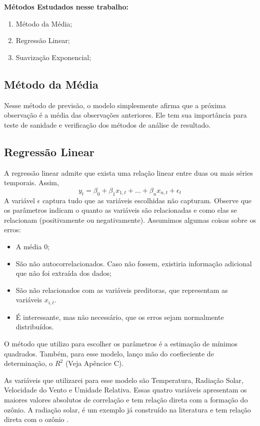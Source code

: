 \textbf{Métodos Estudados nesse trabalho: }
\begin{enumerate}
    \item Método da Média;
    \item Regressão Linear;
    \item Suavização Exponencial; 
\end{enumerate}

\subsection{Método da Média}

Nesse método de previsão, o modelo simplesmente afirma que a próxima
observação é a média das observações anteriores. Ele tem sua importância para
teste de sanidade e verificação dos métodos de análise de resultado.

\subsection{Regressão Linear}

A regressão linear admite que exista uma relação linear entre duas ou mais
séries temporais. Assim, 
$$y_t = \beta_0 + \beta_1x_{1,t} + ... + \beta_nx_{n,t}+ \epsilon_t$$
A variável $\epsilon$ captura tudo que as variáveis escolhidas não capturam.
Observe que os parâmetros indicam o quanto as variáveis são relacionadas e
como elas se relacionam (positivamente ou negativamente). Assumimos algumas
coisas sobre os erros: 

\begin{itemize}
    \item A média $0$;
    \item São não autocorrelacionados. Caso não fossem, existiria informação
    adicional que não foi extraída dos dados;
    \item São não relacionados com as variáveis preditoras, que representam as
    variáveis $x_{i,t}$. 
    \item É interessante, mas não necessário, que os erros sejam normalmente
    distribuídos. 
\end{itemize}

O método que utilizo para escolher os parâmetros é a estimação de mínimos
quadrados. Também, para esse modelo, lanço mão do coefieciente de
determinação, o $R^2$ (Veja Apêncice C).

As variáveis que utilizarei para esse modelo são Temperatura, Radiação Solar, 
Velocidade do Vento e Umidade Relativa. Essas quatro variáveis apresentam os
maiores valores absolutos de correlação e tem relação direta com a formação do
ozônio. A radiação solar, é um exemplo já construído na literatura e tem
relação direta com o ozônio \cite{solarRadiation}. 

